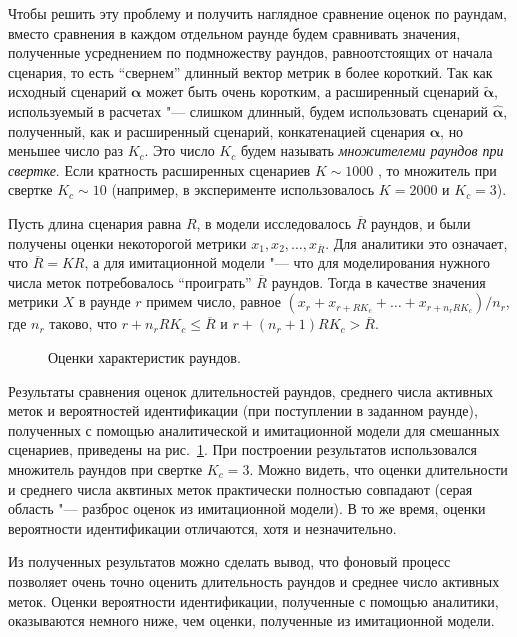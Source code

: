 Чтобы решить эту проблему и получить наглядное сравнение оценок по раундам, вместо сравнения в каждом отдельном раунде будем сравнивать значения, полученные усреднением по подмножеству раундов, равноотстоящих от начала сценария, то есть ``свернем'' длинный вектор метрик в более короткий. Так как исходный сценарий $\bm{\alpha}$ может быть очень коротким, а расширенный сценарий $\widetilde{\bm{\alpha}}$, используемый в расчетах "--- слишком длинный, будем использовать сценарий $\hat{\bm{\alpha}}$, полученный, как и расширенный сценарий, конкатенацией сценария $\bm{\alpha}$, но меньшее число раз $K_c$. Это число $K_c$ будем называть \textit{множителеми раундов при свертке}. Если кратность расширенных сценариев $K \sim 1000$ , то множитель при свертке $K_c \sim 10$ (например, в эксперименте использовалось $K = 2000$ и $K_c = 3$).

Пусть длина сценария равна $R$, в модели исследовалось $\overline{R}$ раундов, и были получены оценки некоторогой метрики $x_1, x_2, \dots, x_{\overline{R}}$. Для аналитики это означает, что $\overline{R} = KR$, а для имитационной модели "--- что для моделирования нужного числа меток потребовалось ``проиграть'' $\overline{R}$ раундов. Тогда в качестве значения метрики $X$ в раунде $r$ примем число, равное $(x_r + x_{r+RK_c} + \dots + x_{r+n_r RK_c}) / n_r$, где $n_r$ таково, что $r + n_r RK_c \leqslant \overline{R}$ и $r + (n_r + 1) RK_c > \overline{R}$.

\begin{figure}[htb]
  \caption{Оценки характеристик раундов.}
  \label{fig:ch3_results_rounds_props}
\end{figure}

Результаты сравнения оценок длительностей раундов, среднего числа активных меток и вероятностей идентификации (при поступлении в заданном раунде), полученных с помощью аналитической и имитационной модели для смешанных сценариев, приведены на рис.~\ref{fig:ch3_results_rounds_props}. При построении результатов использовался множитель раундов при свертке $K_c = 3$. Можно видеть, что оценки длительности и среднего числа аквтиных меток практически полностью совпадают (серая область "--- разброс оценок из имитационной модели). В то же время, оценки вероятности идентификации отличаются, хотя и незначительно.

Из полученных результатов можно сделать вывод, что фоновый процесс позволяет очень точно оценить длительность раундов и среднее число активных меток. Оценки вероятности идентификации, полученные с помощью аналитики, оказываются немного ниже, чем оценки, полученные из имитационной модели.





